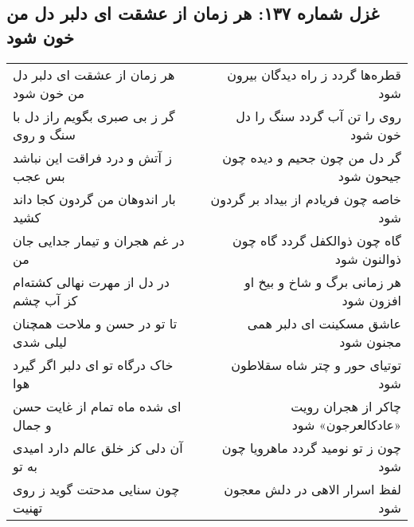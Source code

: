 \begin{center}
\section*{غزل شماره ۱۳۷: هر زمان از عشقت ای دلبر دل من خون شود}
\label{sec:137}
\begin{longtable}{l p{0.5cm} r}
هر زمان از عشقت ای دلبر دل من خون شود
&&
قطره‌ها گردد ز راه دیدگان بیرون شود
\\
گر ز بی صبری بگویم راز دل با سنگ و روی
&&
روی را تن آب گردد سنگ را دل خون شود
\\
ز آتش و درد فراقت این نباشد بس عجب
&&
گر دل من چون جحیم و دیده چون جیحون شود
\\
بار اندوهان من گردون کجا داند کشید
&&
خاصه چون فریادم از بیداد بر گردون شود
\\
در غم هجران و تیمار جدایی جان من
&&
گاه چون ذوالکفل گردد گاه چون ذوالنون شود
\\
در دل از مهرت نهالی کشته‌ام کز آب چشم
&&
هر زمانی برگ و شاخ و بیخ او افزون شود
\\
تا تو در حسن و ملاحت همچنان لیلی شدی
&&
عاشق مسکینت ای دلبر همی مجنون شود
\\
خاک درگاه تو ای دلبر اگر گیرد هوا
&&
توتیای حور و چتر شاه سقلاطون شود
\\
ای شده ماه تمام از غایت حسن و جمال
&&
چاکر از هجران رویت «عادکالعرجون» شود
\\
آن دلی کز خلق عالم دارد امیدی به تو
&&
چون ز تو نومید گردد ماهرویا چون شود
\\
چون سنایی مدحتت گوید ز روی تهنیت
&&
لفظ اسرار الاهی در دلش معجون شود
\\
\end{longtable}
\end{center}
